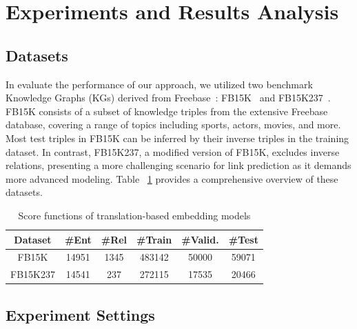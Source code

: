 \documentclass{article}
\begin{document}







\section{Experiments and Results Analysis}
\subsection{Datasets}

In evaluate the performance of our approach, we utilized two benchmark Knowledge Graphs (KGs) derived from Freebase~\cite{10.1145/1376616.1376746}: FB15K~\cite{NIPS2013_1cecc7a7} and FB15K237~\cite{toutanova-chen-2015-observed}. FB15K consists of a subset of knowledge triples from the extensive Freebase database, covering a range of topics including sports, actors, movies, and more. Most test triples in FB15K can be inferred by their inverse triples in the training dataset. In contrast, FB15K237, a modified version of FB15K, excludes inverse relations, presenting a more challenging scenario for link prediction as it demands more advanced modeling. Table ~\ref{tab:datasets} provides a comprehensive overview of these datasets.

\begin{table}[hbtp!]
{
    \centering
    \begin{tabular}{cccccc}
        \toprule
        \textbf{Dataset} & \textbf{\#Ent} & \textbf{\#Rel} & \textbf{\#Train}  & \textbf{\#Valid.} & \textbf{\#Test}\\
        \midrule

        FB15K & 14951 & 1345 & 483142 & 50000 & 59071\\
        FB15K237 & 14541 & 237 & 272115 & 17535 & 20466\\
        
        \bottomrule
    \end{tabular}
    \caption{Score functions of translation-based embedding models}
    \label{tab:datasets}
}
\end{table}

\subsection{Experiment Settings}
\end{document}
